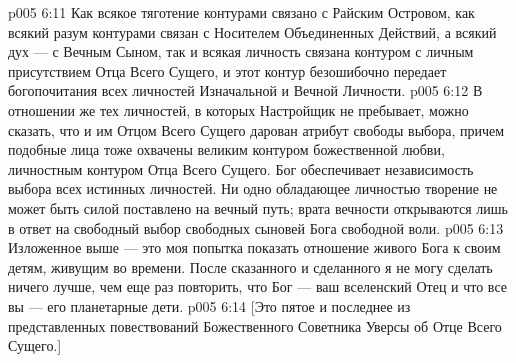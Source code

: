\vs p005 6:11 \pc Как всякое тяготение контурами связано с Райским Островом, как всякий разум контурами связан с Носителем Объединенных Действий, а всякий дух --- с Вечным Сыном, так и всякая личность связана контуром с личным присутствием Отца Всего Сущего, и этот контур безошибочно передает богопочитания всех личностей Изначальной и Вечной Личности.
\vs p005 6:12 \pc В отношении же тех личностей, в которых Настройщик не пребывает, можно сказать, что и им Отцом Всего Сущего дарован атрибут свободы выбора, причем подобные лица тоже охвачены великим контуром божественной любви, личностным контуром Отца Всего Сущего. Бог обеспечивает независимость выбора всех истинных личностей. Ни одно обладающее личностью творение не может быть силой поставлено на вечный путь; врата вечности открываются лишь в ответ на свободный выбор свободных сыновей Бога свободной воли.
\vs p005 6:13 \pc Изложенное выше --- это моя попытка показать отношение живого Бога к своим детям, живущим во времени. После сказанного и сделанного я не могу сделать ничего лучше, чем еще раз повторить, что Бог --- ваш вселенский Отец и что все вы --- его планетарные дети.
\vsetoff
\vs p005 6:14 [Это пятое и последнее из представленных повествований Божественного Советника Уверсы об Отце Всего Сущего.]
